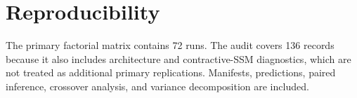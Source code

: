 \documentclass[runningheads]{llncs}
\begin{document}
\section{Reproducibility}
The primary factorial matrix contains 72 runs. The audit covers 136 records
because it also includes architecture and contractive-SSM diagnostics, which
are not treated as additional primary replications. Manifests, predictions,
paired inference, crossover analysis, and variance decomposition are included.



\end{document}
